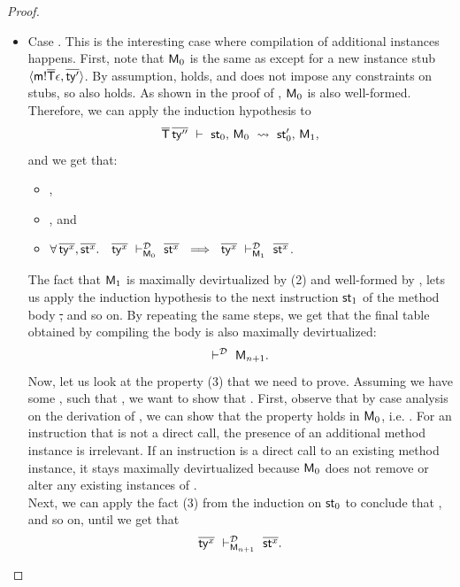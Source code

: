 {\begin{proof}
{\begin{itemize}
    \item Case . This is the interesting case where
      compilation of additional instances happens.
      First, note that $\mtbl_0$ is the same as \mtbl except for a new instance
      stub $\langle \msig\m{\ol{\Ty}}\done, \ol{\ty'} \rangle$.
      By assumption, \devirtm{\mtbl} holds, and  does not impose
      any constraints on stubs, so  also holds.
      As shown in the proof of , $\mtbl_0$ is also well-formed.
      Therefore, we can apply the induction hypothesis to
      \[\compst{\ol\Ty\,\ol{\ty''}}{\st_0}{\mtbl_0}{\S_0}{\st'_0}{\mtbl_1}{\S_1},\]
      and we get that:
      \begin{itemize}
        \item {},
        \item {}, and
        \item $\forall\, \ol{\ty^x}, \ol{\st^x}.\quad
        \devirtst{\ol{\ty^x}}{\mtbl_0}{\ol{\st^x}}\ \implies\
        \devirtst{\ol{\ty^x}}{\mtbl_1}{\ol{\st^x}}$.
      \end{itemize}
      The fact that $\mtbl_1$ is maximally devirtualized by (2)
      and well-formed by , lets us apply the
      induction hypothesis to the next instruction $\st_1$ of the method
      body \ol\st, and so on.  By repeating the same steps, we get
      that the final table obtained by compiling the body is
      also maximally devirtualized:
        \[\devirtm{\mtbl_{n+1}}.\]
      Now, let us look at the property (3) that we need to prove.
      Assuming we have some \ol{\ty^x}, \ol{\st^x} such that
      ,
      we want to show that
      .
      First, observe that by case analysis on the derivation of
      ,
      we can show that the property holds in $\mtbl_0$, i.e.
        .
      For an instruction that is not a direct call, the presence of an additional
      method instance is irrelevant. If an instruction is a direct call to an
      existing method instance, it stays maximally devirtualized because
      $\mtbl_0$ does not remove or alter any existing instances of \mtbl.\\
      Next, we can apply the fact (3) from the induction on $\st_0$
      to conclude that \devirtst{\ol{\ty^x}}{\mtbl_1}{\ol{\st^x}},
      and so on, until we get that
        \[\devirtst{\ol{\ty^x}}{\mtbl_{n+1}}{\ol{\st^x}}.\]

\end{itemize}}
\end{proof}}
